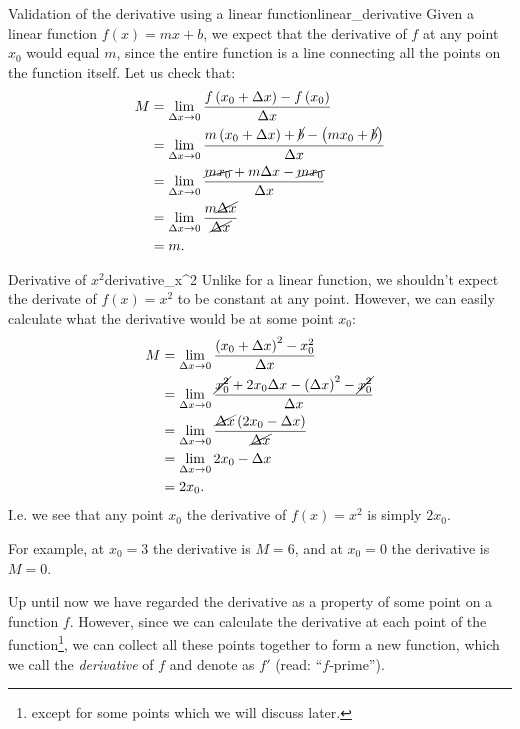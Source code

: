 \begin{example}{Validation of the derivative using a linear function}{linear_derivative}
  Given a linear function $f(x)=mx+b$, we expect that the derivative of $f$ at any point $x_{0}$ would equal $m$, since the entire function is a line connecting all the points on the function itself. Let us check that:
  \begin{align*}
    M &= \lim\limits_{\Delta x\to 0}\frac{f\left(x_{0}+\Delta x\right)-f\left(x_{0}\right)}{\Delta x}\\
      &= \lim\limits_{\Delta x\to 0}\frac{m\left(x_{0}+\Delta x\right)+\cancel{b}-\left(mx_{0}+\cancel{b}\right)}{\Delta x}\\
      &= \lim\limits_{\Delta x\to 0}\frac{\cancel{mx_{0}}+m\Delta x-\cancel{mx_{0}}}{\Delta x}\\
      &= \lim\limits_{\Delta x\to 0}\frac{m\cancel{\Delta x}}{\cancel{\Delta x}}\\
      &= m.
  \end{align*}
\end{example}

\begin{example}{Derivative of $x^{2}$}{derivative_x^2}
  Unlike for a linear function, we shouldn't expect the derivate of $f(x)=x^{2}$ to be constant at any point. However, we can easily calculate what the derivative would be at some point $x_{0}$:
  \begin{align*}
    M &= \lim\limits_{\Delta x\to 0}\frac{\left(x_{0}+\Delta x\right)^{2}-x_{0}^{2}}{\Delta x}\\
      &= \lim\limits_{\Delta x\to 0}\frac{\cancel{x_{0}^{2}}+2x_{0}\Delta x-\left(\Delta x\right)^{2}-\cancel{x_{0}^{2}}}{\Delta x}\\
      &= \lim\limits_{\Delta x\to 0}\frac{\cancel{\Delta x}\left(2x_{0}-\Delta x\right)}{\cancel{\Delta x}}\\
      &= \lim\limits_{\Delta x\to 0}2x_{0}-\Delta x\\
      &= 2x_{0}.
  \end{align*}
  I.e. we see that any point $x_{0}$ the derivative of $f(x)=x^{2}$ is simply $2x_{0}$.

  For example, at $x_{0}=3$ the derivative is $M=6$, and at $x_{0}=0$ the derivative is $M=0$.
\end{example}

Up until now we have regarded the derivative as a property of some point on a function $f$. However, since we can calculate the derivative at each point of the function\footnote{except for some points which we will discuss later.}, we can collect all these points together to form a new function, which we call the \emph{derivative} of $f$ and denote as $f'$ (read: ``$f$-prime'').

